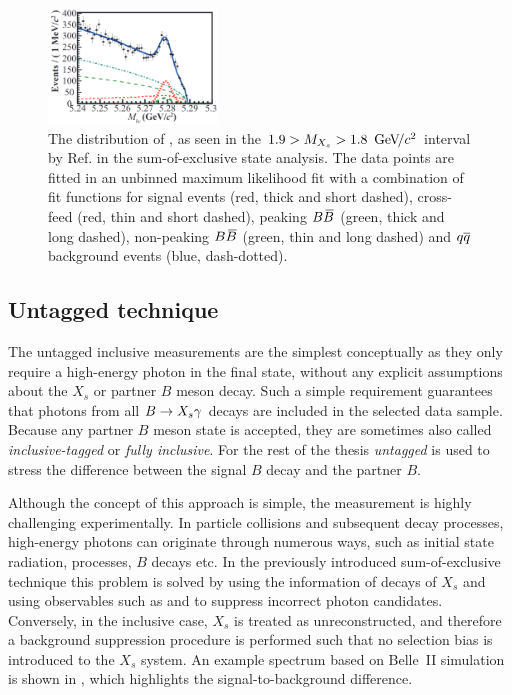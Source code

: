 \begin{figure}[htbp!]
    \centering
    \includegraphics[width=0.4\textwidth]{figures/experiment_overview/Mbc_sum_exclusive_Belle.png}
    \caption{\label{fig:mbc_sum_of_exclusive} 
    The distribution of \Mbc, as seen in the $1.9>M_{X_s}>1.8~{\mathrm{\,Ge\kern -0.1em V\!/}c^2}$ interval by Ref.\cite{Belle:2014nmp} in the sum-of-exclusive state analysis.
    The data points are fitted in an unbinned maximum likelihood fit with a combination of fit functions for 
    signal events (red, thick and short dashed), 
    cross-feed (red, thin and short dashed), 
    peaking $B\kern 0.18em\overline{\kern -0.18em B}{}$ (green, thick and long dashed), 
    non-peaking $B\kern 0.18em\overline{\kern -0.18em B}{}$ (green, thin and long dashed)
    and $q\overline q$ background events (blue, dash-dotted).
    }
\end{figure}

\subsection{Untagged technique}\label{sec:untagged}
The untagged inclusive measurements are the simplest conceptually as they only require a high-energy photon in the final state, without any explicit assumptions about the $X_s$ or partner $B$ meson decay.
Such a simple requirement guarantees that photons from all $\BtoXsgamma$ decays are included in the selected data sample.
Because any partner $B$ meson state is accepted, they are sometimes also called \textit{inclusive-tagged} or \textit{fully inclusive}.
For the rest of the thesis \textit{untagged} is used to stress the difference between the signal $B$ decay and the partner $B$.

Although the concept of this approach is simple, the measurement is highly challenging experimentally.
In particle collisions and subsequent decay processes, high-energy photons can originate through numerous ways, such as initial \epem state radiation, \epem\ra\qqbar processes, $B$ decays etc.
In the previously introduced sum-of-exclusive technique this problem is solved by using the information of decays of $X_s$ and using observables such as \Mbc and \DeltaE to suppress incorrect photon candidates. 
Conversely, in the inclusive case, $X_s$ is treated as unreconstructed, and therefore a background suppression procedure is performed such that no selection bias is introduced to the $X_s$ system.
An example spectrum based on Belle~II simulation is shown in , which highlights the signal-to-background difference.

